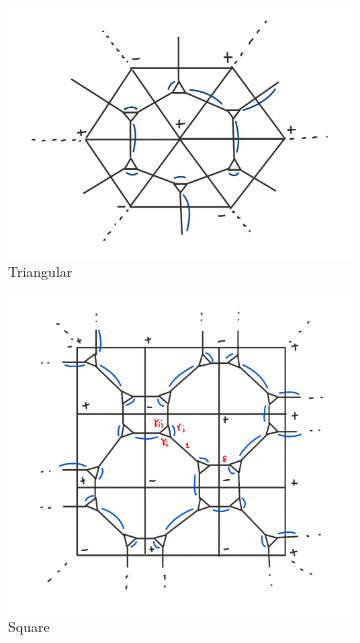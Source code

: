 \documentclass{article}
\begin{document}
	\begin{figure}[h]
		\centering
		\begin{subfigure}[b]{0.33\textwidth}
			\includegraphics[width=\textwidth]{Triangular.jpg}
			\caption{Triangular}
			\label{fig:img1}
		\end{subfigure}
		\hfill
		\begin{subfigure}[b]{0.25\textwidth}
			\includegraphics[width=\textwidth]{Square dimer.jpg}
			\caption{Square}
			\label{fig:img2}
		\end{subfigure}
		\hfill
		\begin{subfigure}[b]{0.25\textwidth}

\end{subfigure}
\end{figure}
\end{document}
